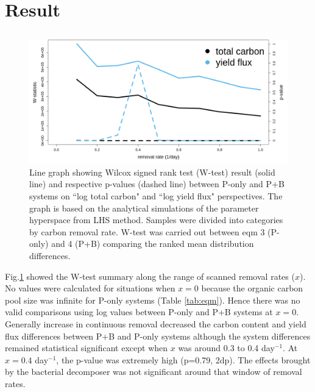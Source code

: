 \documentclass[../thesis.tex]{subfiles} %
\begin{document}
\section{Result}
\subsection{\hI}
\begin{figure}[H]
    \centering
    \includegraphics[width=\linewidth]{../result/Wilcox.png}
    \caption[Wilcox test summary]{Line graph showing Wilcox signed rank test (W-test) result (solid line) and respective p-values (dashed line) between P-only and P+B systems on ``log total carbon" and ``log yield flux" perspectives.  {\scriptsize The graph is based on the analytical simulations of the parameter hyperspace from LHS method.  Samples were divided into categories by carbon removal rate.  W-test was carried out between eqm 3 (P-only) and 4 (P+B) comparing the ranked mean distribution differences.}}
    \label{fig:wilcox}
\end{figure}

Fig.\ref{fig:wilcox} showed the W-test summary along the range of scanned removal rates ($x$).  No values were calculated for situations when $x=0$ because the organic carbon pool size was infinite for P-only systems (Table \ref{tab:eqm}).  Hence there was no valid comparisons using log values between P-only and P+B systems at $x=0$.  Generally increase in continuous removal decreased the carbon content and yield flux differences between P+B and P-only systems although the system differences remained statistical significant except when $x$ was around 0.3 to 0.4 day$^{-1}$.  At $x=0.4$ day$^{-1}$, the p-value was extremely high (p=0.79, 2dp).  The effects brought by the bacterial decomposer was not significant around that window of removal rates.


\subsection{\hII}
\end{document}
